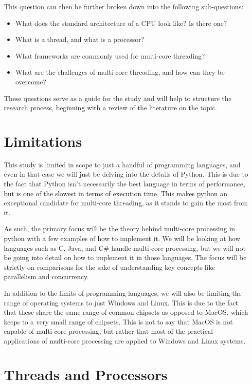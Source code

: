 \documentclass{article}
\begin{document}
This question can then be further broken down into the following sub-questions:

\begin{itemize}
    \item What does the standard architecture of a CPU look like? Is there one?
    \item What is a thread, and what is a processor?
    \item What frameworks are commonly used for multi-core threading?
    \item What are the challenges of multi-core threading, and how can they be overcome?
\end{itemize}

These questions serve as a guide for the study and will help to structure the research process, beginning with a review of the literature on the topic.

\section{Limitations}

This study is limited in scope to just a handful of programming languages, and even in that case we will just be delving into the details of Python. This is due to the fact that Python isn't necessarily the best language in terms of performance, but is one of the slowest in terms of execution time. This makes python an exceptional candidate for multi-core threading, as it stands to gain the most from it.

As such, the primary focus will be the theory behind multi-core processing in python with a few examples of how to implement it. We will be looking at how languages such as C, Java, and C\# handle multi-core processing, but we will not be going into detail on how to implement it in those languages. The focus will be strictly on comparisons for the sake of understanding key concepts like parallelism and concurrency.

In addition to the limits of programming languages, we will also be limiting the range of operating systems to just Windows and Linux. This is due to the fact that these share the same range of common chipsets as opposed to MacOS, which keeps to a very small range of chipsets. This is not to say that MacOS is not capable of multi-core processing, but rather that most of the practical applications of multi-core processing are applied to Windows and Linux systems.

\section{Threads and Processors}
\end{document}
